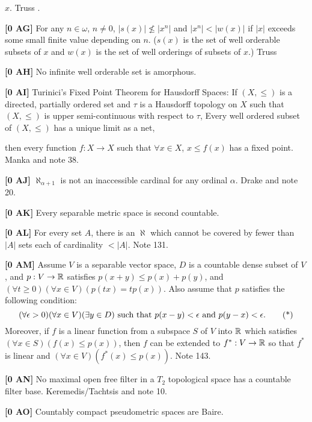 $x$.  \ac{Truss} \cite{1973d}.
\smallskip
\item{}{\bf [0 AG]} For any $n\in\omega$, $n\neq 0$, $|s(x)|\not\le |x^n|$
and $|x^n|< |w(x)|$ if $|x|$ exceeds some small finite value depending on
$n$.  ($s(x) $ is the set of well orderable subsets of $x$ and $w(x)$ is
the set of well orderings of subsets of $x$.)  \ac{Truss} \cite{1973d}
\smallskip
\item{}{\bf [0 AH]}  No infinite well orderable set is amorphous.
\smallskip
\item{}{\bf [0 AI]} Turinici's Fixed Point Theorem for Hausdorff Spaces:
If $(X,\le)$ is a directed, partially ordered set and $\tau$ is a
Hausdorff topology on $X$ such that
 $(X,\le)$ is upper semi-continuous with respect to $\tau$,
 Every well ordered subset of $(X,\le)$ has a unique
limit as a net, \par
\item{}then every function $f:X\to X$ such that $\forall x\in X$,
$x\le f(x)$ has a fixed point. \ac{Manka} \cite{1988b} and note 38.
\smallskip
\item{}{\bf [0 AJ] }  $\aleph_{\alpha+1}$ is not an inaccessible cardinal
for any ordinal $\alpha$.  \ac{Drake} \cite{1974} and note 20.
\smallskip
\item{}{\bf [0 AK]} Every separable metric space is second countable.
\smallskip
\item{}{\bf [0 AL]} For every set $A$, there is an $\aleph$ which cannot
be covered by fewer than $|A|$ sets each of cardinality $< |A|$. Note 131.
\smallskip
\item{}{\bf [0 AM]} Assume $V$ is a separable vector space, $D$ is
a countable dense subset of $V$, and $p :V \to \Bbb R$ satisfies
$p(x+y) \le p(x) + p(y)$, and
$(\forall t\ge 0)(\forall x\in V)(p(tx) = tp(x))$. Also assume that
$p$ satisfies the following condition:
$$(\forall \epsilon > 0)(\forall x\in V)(\exists y\in D)\hbox{ such that }
p(x - y) < \epsilon\hbox{ and }p(y - x) < \epsilon.\tag*$$
Moreover, if $f$ is a linear function from a subspace $S$ of $V$ into
$\Bbb R$ which satisfies $(\forall x \in S)(f(x) \le p(x))$, then $f$ can
be extended to $f^* :V \to \Bbb R$ so that $f^* $ is linear and
$(\forall x \in V)(f^*(x) \le p(x))$. Note 143.
\smallskip
\item{}{\bf [0 AN]} No maximal open free filter in a $T_2$ topological
space has a countable filter base. \ac{Keremedis/Tachtsis} \cite{1999b}
and note 10.
\smallskip
\item{}{\bf [0 AO]} Countably compact pseudometric spaces are Baire.
